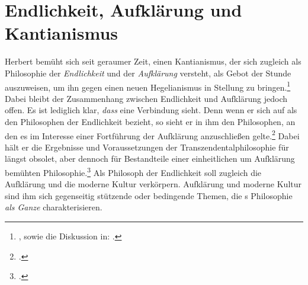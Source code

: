 \section{Endlichkeit, Aufklärung und
Kantianismus}\label{section:EndlichkeitundKantianismus}
Herbert  bemüht sich seit geraumer Zeit, einen Kantianismus,
der sich zugleich als Philosophie der \emph{Endlichkeit} und der \emph{Aufklärung} versteht,
als Gebot der Stunde auszuweisen, um ihn gegen einen neuen Hegelianismus in Stellung zu
bringen.\footnote{\cite[Vgl.][]{Schnaedelbach:HegelsErben2006,Schnaedelbach:WirKantianer2005,Schnaedelbach:WarumHegel?1999},
sowie die Diskussion in: \cite{Stekeler-Weithofer:StreitumHegel2000}.} Dabei
bleibt der Zusammenhang zwischen Endlichkeit und Aufklärung jedoch offen. Es ist
lediglich klar, \emph{dass}  eine Verbindung sieht. Denn wenn
er sich auf  als den Philosophen der Endlichkeit
bezieht, so sieht er  in ihm den Philosophen, an den es im
Interesse einer Fortführung der Aufklärung anzuschließen
gelte.\footcite[Vgl.][836-7]{Schnaedelbach:WirKantianer2005} Dabei hält er die
Ergebnisse und Voraussetzungen der Transzendentalphilosophie für längst obsolet, aber
dennoch für Bestandteile einer einheitlichen um Aufklärung bemühten
Philosophie.\footnote{\cite[Vgl.][]{Schnaedelbach:WirKantianer2005}.} Als
Philosoph der Endlichkeit soll  zugleich die Aufklärung und die
moderne Kultur verkörpern. Aufklärung und moderne Kultur sind ihm sich
gegenseitig stützende oder bedingende Themen, die s Philosophie
\emph{als Ganze} charakterisieren.

